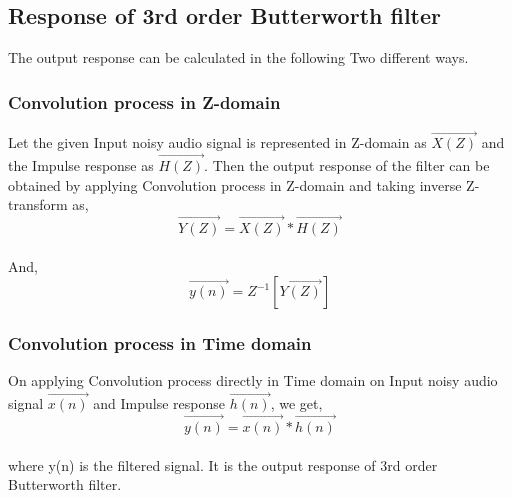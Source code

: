 \documentclass[journal,10pt,twocolumn]{article}
\begin{document}
\begin{flushleft}
\subsection{Response of 3rd order Butterworth filter}
\vspace{0.2cm}
The output response can be calculated in the following Two different ways.\\
\vspace{0.2cm}
\subsubsection{Convolution process in Z-domain}
\vspace{0.2cm}
Let the given Input noisy audio signal is represented in Z-domain as $\vec{X(Z)}$ and the Impulse response as $\vec{H(Z)}$.
Then the output response of the filter can be obtained by applying Convolution process in Z-domain and taking inverse Z-transform as,\\
\begin{equation}
\vec{Y(Z)}= \vec{X(Z)} * \vec{H(Z)}
\end{equation}\\
\vspace{0.2cm}
And,
\begin{equation}
\vec{y(n)}= Z^{-1}[\vec{Y(Z)}]
\end{equation}
\vspace{0.2cm}
\subsubsection{Convolution process in Time domain}
\vspace{0.2cm}
On applying Convolution  process directly in Time domain on Input noisy audio signal $\vec{x(n)}$ and Impulse response $\vec{h(n)}$, we get,
\vspace{0.25cm}
\begin{equation}
    \vec{y(n)} = \vec{x(n)}*\vec{h(n)}
\end{equation}\\

where y(n) is the filtered signal. It is the output response of 3rd order Butterworth filter.\\
\vspace{0.3cm}

\end{flushleft}
\end{document}
